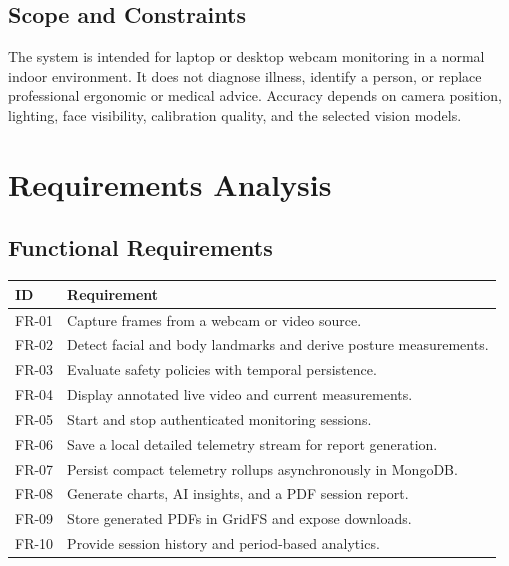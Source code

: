 \documentclass[12pt,a4paper]{report}
\begin{document}
\section{Scope and Constraints}
The system is intended for laptop or desktop webcam monitoring in a normal
indoor environment. It does not diagnose illness, identify a person, or replace
professional ergonomic or medical advice. Accuracy depends on camera position,
lighting, face visibility, calibration quality, and the selected vision models.

\chapter{Requirements Analysis}
\section{Functional Requirements}
\begin{longtable}{p{}p{}}
\toprule
\textbf{ID} & \textbf{Requirement}\\
\midrule
FR-01 & Capture frames from a webcam or video source.\\
FR-02 & Detect facial and body landmarks and derive posture measurements.\\
FR-03 & Evaluate safety policies with temporal persistence.\\
FR-04 & Display annotated live video and current measurements.\\
FR-05 & Start and stop authenticated monitoring sessions.\\
FR-06 & Save a local detailed telemetry stream for report generation.\\
FR-07 & Persist compact telemetry rollups asynchronously in MongoDB.\\
FR-08 & Generate charts, AI insights, and a PDF session report.\\
FR-09 & Store generated PDFs in GridFS and expose downloads.\\
FR-10 & Provide session history and period-based analytics.\\
\bottomrule
\end{longtable}
\end{document}

